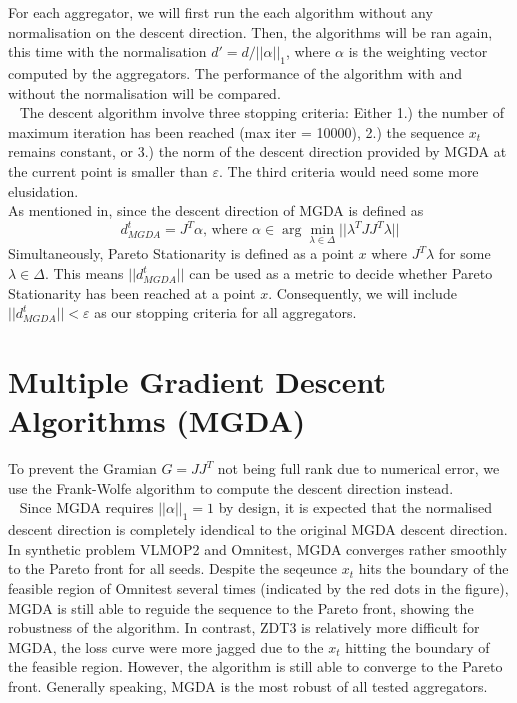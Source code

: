 \documentclass{article}
\renewcommand{\epsilon}{\varepsilon}
\renewcommand{\|}{\biggr|}
\begin{document}
    For each aggregator, we will first run the each algorithm without any normalisation on the descent direction. Then, the algorithms will be ran again, this time with the normalisation $d' = d / ||\alpha||_1$, where $\alpha$ is the weighting vector computed by the aggregators. The performance of the algorithm with and without the normalisation will be compared.\\
    ~
    The descent algorithm involve three stopping criteria: Either 1.) the number of maximum iteration has been reached (max iter = 10000), 2.) the sequence $x_t$ remains constant, or 3.) the norm of the descent direction provided by MGDA at the current point is smaller than $\epsilon$. The third criteria would need some more elusidation.\\
    As mentioned in, since the descent direction of MGDA is defined as
    \begin{equation*}
        d^t_{MGDA} = J^T \alpha\text{, where }\alpha \in\arg\min_{\lambda\in\Delta}||\lambda^T JJ^T\lambda||
    \end{equation*}
    Simultaneously, Pareto Stationarity is defined as a point $x$ where $J^T\lambda$ for some $\lambda\in \Delta$. This means $||d^t_{MGDA}||$ can be used as a metric to decide whether Pareto Stationarity has been reached at a point $x$. Consequently, we will include $||d^t_{MGDA}|| < \epsilon$ as our stopping criteria for all aggregators. 
    \section{Multiple Gradient Descent Algorithms (MGDA)}
    To prevent the Gramian $G = JJ^T$ not being full rank due to numerical error, we use the Frank-Wolfe algorithm to compute the descent direction instead.\\
    ~
    Since MGDA requires $||\alpha||_1 = 1$ by design, it is expected that the normalised descent direction is completely idendical to the original MGDA descent direction.\\
    In synthetic problem VLMOP2 and Omnitest, MGDA converges rather smoothly to the Pareto front for all seeds. Despite the seqeunce $x_t$ hits the boundary of the feasible region of Omnitest several times (indicated by the red dots in the figure), MGDA is still able to reguide the sequence to the Pareto front, showing the robustness of the algorithm. In contrast, ZDT3 is relatively more difficult for MGDA, the loss curve were more jagged due to the $x_t$ hitting the boundary of the feasible region. However, the algorithm is still able to converge to the Pareto front. Generally speaking, MGDA is the most robust of all tested aggregators.\\
\end{document}
